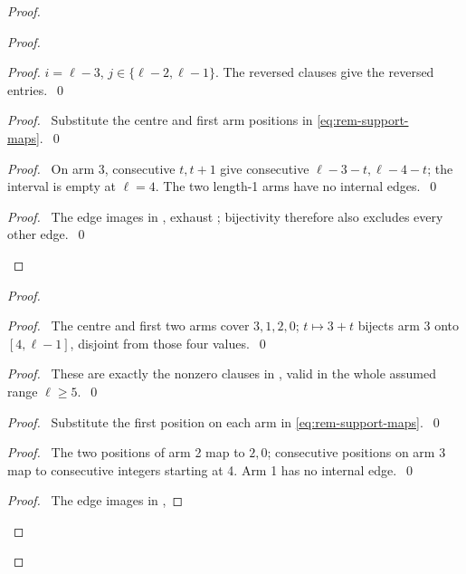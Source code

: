 \begin{proof}
\begin{proof}
\begin{proof}
$i=\ell-3$, $j\in\{\ell-2,\ell-1\}$.
The reversed clauses give the reversed entries.~\qed\end{proof}
\begin{proof}\pf\ Substitute the centre and first arm positions
in \eqref{eq:rem-support-maps}.~\qed\end{proof}
\begin{proof}\pf\ On arm 3, consecutive $t,t+1$ give consecutive
$\ell-3-t,\ell-4-t$; the interval is empty at $\ell=4$.
The two length-1 arms have no internal edges.~\qed\end{proof}
\qedstep
\begin{proof}\pf\ The edge images in ,
 exhaust ; bijectivity
 therefore also excludes every other edge.~\qed\end{proof}
\end{proof}
\begin{proof}
\begin{proof}\pf\ The centre and first two arms cover $3,1,2,0$;
$t\mapsto3+t$ bijects arm 3 onto $[4,\ell-1]$,
disjoint from those four values.~\qed\end{proof}
\begin{proof}\pf\ These are exactly the nonzero clauses in
, valid in the whole assumed range $\ell\geq5$.~\qed\end{proof}
\begin{proof}\pf\ Substitute the first position on each arm
in \eqref{eq:rem-support-maps}.~\qed\end{proof}
\begin{proof}\pf\ The two positions of arm 2 map to $2,0$;
consecutive positions on arm 3 map to consecutive integers starting at 4.
Arm 1 has no internal edge.~\qed\end{proof}
\qedstep
\begin{proof}\pf\ The edge images in ,

\end{proof}
\end{proof}
\end{proof}
